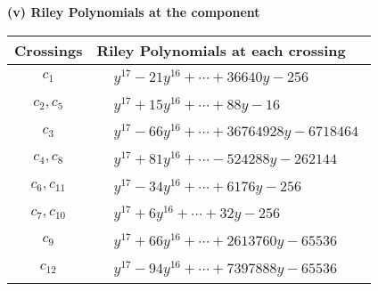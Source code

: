 \documentclass[1p]{elsarticle_modified}
\theoremstyle{definition}
\begin{document}
\newpage\renewcommand{\arraystretch}{1}
\flushleft \textbf{(v) Riley Polynomials at the component}\newline \\
\begin{tabular}{m{50pt}|m{274pt}}
Crossings & \hspace{64pt}Riley Polynomials at each crossing \\
\hline $$\begin{aligned}c_{1}\end{aligned}$$&$\begin{aligned}
&y^{17}-21 y^{16}+\cdots+36640 y-256
\end{aligned}$\\
\hline $$\begin{aligned}c_{2},c_{5}\end{aligned}$$&$\begin{aligned}
&y^{17}+15 y^{16}+\cdots+88 y-16
\end{aligned}$\\
\hline $$\begin{aligned}c_{3}\end{aligned}$$&$\begin{aligned}
&y^{17}-66 y^{16}+\cdots+36764928 y-6718464
\end{aligned}$\\
\hline $$\begin{aligned}c_{4},c_{8}\end{aligned}$$&$\begin{aligned}
&y^{17}+81 y^{16}+\cdots-524288 y-262144
\end{aligned}$\\
\hline $$\begin{aligned}c_{6},c_{11}\end{aligned}$$&$\begin{aligned}
&y^{17}-34 y^{16}+\cdots+6176 y-256
\end{aligned}$\\
\hline $$\begin{aligned}c_{7},c_{10}\end{aligned}$$&$\begin{aligned}
&y^{17}+6 y^{16}+\cdots+32 y-256
\end{aligned}$\\
\hline $$\begin{aligned}c_{9}\end{aligned}$$&$\begin{aligned}
&y^{17}+66 y^{16}+\cdots+2613760 y-65536
\end{aligned}$\\
\hline $$\begin{aligned}c_{12}\end{aligned}$$&$\begin{aligned}
&y^{17}-94 y^{16}+\cdots+7397888 y-65536
\end{aligned}$\\
\hline
\end{tabular}\\~\\
\end{document}

